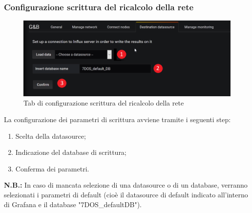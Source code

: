\subsubsection{Configurazione scrittura del ricalcolo della rete}
\begin{figure} [H]
	\centering
	\includegraphics[scale=0.55]{Img/setds} 
	\caption{Tab di configurazione scrittura del ricalcolo della rete} \label{} 
\end{figure} 
La configurazione dei parametri di scrittura avviene tramite i seguenti step:
\begin{enumerate}
	\item Scelta della datasource;
	\item Indicazione del database di scrittura;
	\item Conferma dei parametri.
\end{enumerate}

\textbf{N.B.:} In caso di mancata selezione di una datasource o di un database, verranno selezionati i parametri di default (cioè il datasource di default indicato all'interno di Grafana e il database "7DOS\_defaultDB").